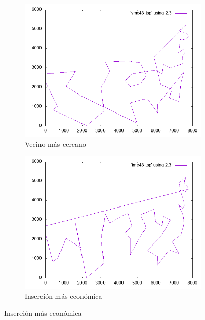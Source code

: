 \documentclass[12pt,spanish]{article}
\begin{document}
\begin{figure}[H]
\centering
\begin{subfigure}[b]{0.36\textwidth}
\includegraphics[width=\textwidth]{att48_vmc.png}
\caption{Vecino más cercano}
\end{subfigure}
\quad

\begin{subfigure}[b]{0.36\textwidth}
\includegraphics[width=\textwidth]{att48_ime.png}
\caption{Inserción más económica}
\end{subfigure}

\vspace{1cm}


\end{figure}
\end{document}
